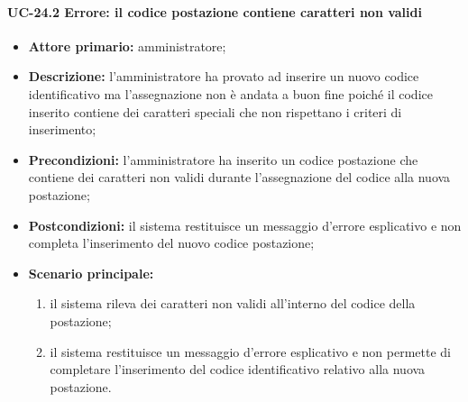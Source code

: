 \paragraph{UC-24.2 Errore: il codice postazione contiene caratteri non validi}
\begin{itemize}
	\item \textbf{Attore primario:} amministratore;
	\item \textbf{Descrizione:} l'amministratore ha provato ad inserire un nuovo codice identificativo ma l'assegnazione non è andata a buon fine poiché il codice inserito contiene dei caratteri speciali che non rispettano i criteri di inserimento;
	\item \textbf{Precondizioni:} l'amministratore ha inserito un codice postazione che contiene dei caratteri non validi durante l'assegnazione del codice alla nuova postazione;
	\item \textbf{Postcondizioni:} il sistema restituisce un messaggio d'errore esplicativo e non completa l'inserimento del nuovo codice postazione;
	\item \textbf{Scenario principale:}
	      \begin{enumerate}
		      \item il sistema rileva dei caratteri non validi all'interno del codice della postazione;
		      \item il sistema restituisce un messaggio d'errore esplicativo e non permette di completare l'inserimento del codice identificativo relativo alla nuova postazione.
	      \end{enumerate}
\end{itemize}

